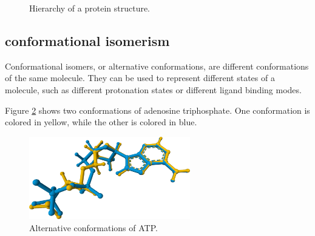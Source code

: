 \documentclass[
  digital,     %
  oneside,     %
  nosansbold,  %
  nocolorbold, %
  lof,         %
  lot,         %
]{fithesis4}
\begin{document}
\begin{figure}[htbp]
  \centering
  \caption{Hierarchy of a protein structure.}
  \label{fig:structure}
\end{figure}

\subsection{conformational isomerism}
\label{section:alternative_conformations}

Conformational isomers, or alternative conformations, are different conformations of the same molecule. They can be used to represent different states of a molecule, such as different protonation states or different ligand binding modes. 

Figure \ref{fig:alternative_conformations} shows two conformations of adenosine triphosphate. One conformation is colored in yellow, while the other is colored in blue.

\begin{figure}[htbp]
  \begin{center}
    \includegraphics[width=7cm]{figures/alt_conformations.png}
  \end{center}
  \caption{Alternative conformations of ATP.}
  \label{fig:alternative_conformations}
\end{figure}
\end{document}
